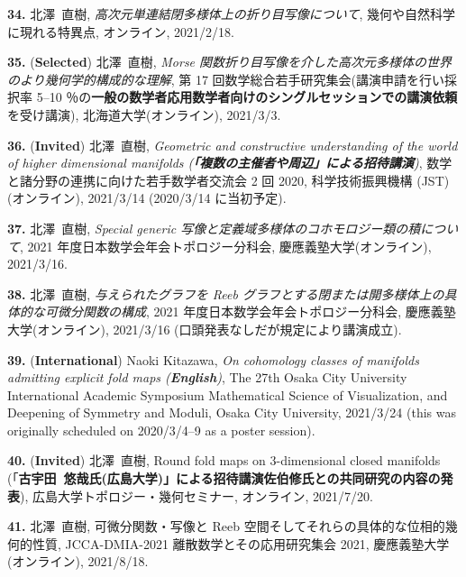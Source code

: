\documentclass{article}
\begin{document}
\par\noindent
{\bf 34.} 北澤\ 直樹, \textsl{高次元単連結閉多様体上の折り目写像について}, 幾何や自然科学に現れる特異点, オンライン, 2021/2/18.

\par\noindent
{\bf 35.} ({\bf Selected}) 北澤\ 直樹, \textsl{{\rm Morse} 関数折り目写像を介した高次元多様体の世界のより幾何学的構成的な理解}, 第 17 回数学総合若手研究集会(講演申請を行い採択率 5--10 ％の{\bf 一般の数学者応用数学者向けのシングルセッションでの講演依頼}を受け講演), 北海道大学(オンライン), 2021/3/3.


\par\noindent
{\bf 36.}  ({\bf  Invited}) 北澤\ 直樹, \textsl{Geometric and constructive understanding of the world of higher dimensional manifolds {\rm (}{\bf 「複数の主催者や周辺」による招待講演}{\rm )}}, 数学と諸分野の連携に向けた若手数学者交流会 2 回 2020, 科学技術振興機構 (JST)(オンライン),  2021/3/14 (2020/3/14 に当初予定).

\par\noindent
{\bf 37.} 北澤\ 直樹, \textsl{Special generic 写像と定義域多様体のコホモロジー類の積について}, 2021 年度日本数学会年会トポロジー分科会, 慶應義塾大学(オンライン), 2021/3/16.

\par\noindent
{\bf 38.} 北澤\ 直樹, \textsl{与えられたグラフを Reeb グラフとする閉または開多様体上の具体的な可微分関数の構成}, 2021 年度日本数学会年会トポロジー分科会, 慶應義塾大学(オンライン), 2021/3/16 (口頭発表なしだが規定により講演成立).

\par\noindent
{\bf 39.} ({\bf International}) Naoki Kitazawa,  \textsl{On cohomology classes of manifolds admitting explicit fold maps {\rm (}{\bf English}{\rm )}}, The 27th Osaka City University International Academic Symposium Mathematical Science of Visualization, and Deepening of Symmetry and Moduli, Osaka City University, 2021/3/24 (this was originally scheduled on 2020/3/4--9 as a poster session).

\par\noindent
{\bf 40.}  ({\bf  Invited}) 北澤\ 直樹, Round fold maps on 3-dimensional closed manifolds (「{\bf 古宇田\ 悠哉\quad 氏(広島大学)」による招待講演佐伯修氏との共同研究の内容の発表}), 広島大学トポロジー・幾何セミナー, オンライン, 2021/7/20.

\par\noindent
{\bf 41.} 北澤\ 直樹, 可微分関数・写像と Reeb 空間そしてそれらの具体的な位相的幾何的性質, JCCA-DMIA-2021 離散数学とその応用研究集会 2021, 慶應義塾大学(オンライン), 2021/8/18.
\end{document}
